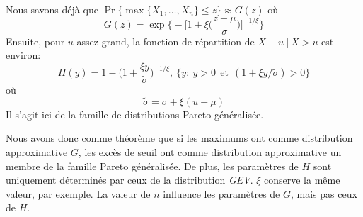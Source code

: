\begin{theorem}\label{theor:1.2}
Nous savons déjà que $\Pr\{ \max\{X_1,\dots,X_n\} \le z \}\approx G(z)$
où
\begin{equation*}
{G(z) = \exp \Bigg\{ - \Big[ 1 +\xi\Big(\frac{z-\mu}{\sigma}\Big) \Big]^{-1/\xi}  \Bigg\}}
\end{equation*}
Ensuite, pour $u$ assez grand, la fonction de répartition de $X-u\ |\ X>u$ est environ:
\begin{equation*}
H(y) = 1 - \Big(1+\frac{\xi y}{\tilde\sigma}\Big)^{-1/\xi},\ \{y:\ y>0\ \ \text{et}\ \ (1+ \xi y/\tilde{\sigma})>0 \} 
\end{equation*}
où
\begin{equation*}
{\tilde{\sigma} = \sigma + \xi(u-\mu)}
\end{equation*}
Il s'agit ici de la famille de distributions Pareto généralisée.
\end{theorem}

Nous avons donc comme théorème que si les maximums ont comme distribution approximative $G$, les excès de seuil ont comme distribution approximative un membre de la famille Pareto généralisée. De plus, les paramètres de $H$ sont uniquement déterminés par ceux de la distribution \textit{GEV}. $\xi$ conserve la même valeur, par exemple. La valeur de $n$ influence les paramètres de $G$, mais pas ceux de $H$.

